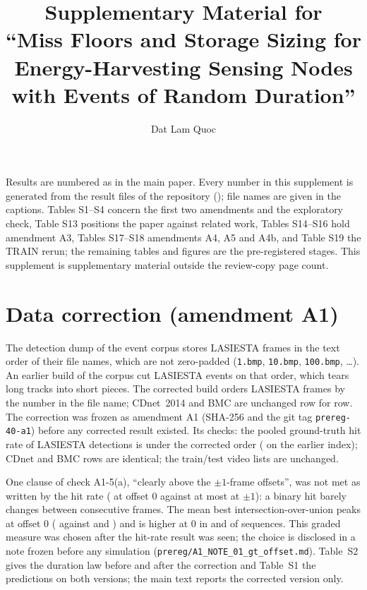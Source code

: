 \documentclass[10pt]{article}
\title{Supplementary Material for\\``Miss Floors and Storage Sizing for Energy-Harvesting Sensing Nodes with Events of Random Duration''}
\author{Dat Lam Quoc}
\date{}
\begin{document}
\maketitle
Results are numbered as in the main paper. Every number in this supplement is generated from the result files of the repository (\repoURL); file names are given in the captions. Tables S1--S4 concern the first two amendments and the exploratory check, Table S13 positions the paper against related work, Tables S14--S16 hold amendment A3, Tables S17--S18 amendments A4, A5 and A4b, and Table S19 the TRAIN rerun; the remaining tables and figures are the pre-registered stages. This supplement is supplementary material outside the review-copy page count.



\section{Data correction (amendment A1)}
The detection dump of the event corpus stores LASIESTA frames in the text order of their file names, which are not zero-padded (\texttt{1.bmp}, \texttt{10.bmp}, \texttt{100.bmp}, \ldots). An earlier build of the corpus cut LASIESTA events on that order, which tears long tracks into short pieces. The corrected build orders LASIESTA frames by the number in the file name; CDnet~2014 and BMC are unchanged row for row. The correction was frozen as amendment A1 (SHA-256 and the git tag \texttt{prereg-40-a1}) before any corrected result existed. Its checks: the pooled ground-truth hit rate of LASIESTA detections is \AoneHit{} under the corrected order (\AoneHitIdx{} on the earlier index); CDnet and BMC rows are identical; the train/test video lists are unchanged.

One clause of check A1-5(a), ``clearly above the $\pm1$-frame offsets'', was not met as written by the hit rate (\AoneHit{} at offset 0 against at most \AoneHitPm{} at $\pm1$): a binary hit barely changes between consecutive frames. The mean best intersection-over-union peaks at offset 0 (\AoneIoUz{} against \AoneIoUm{} and \AoneIoUp) and is higher at 0 in \AoneSeqM{} and \AoneSeqP{} of \AoneNseq{} sequences. This graded measure was chosen after the hit-rate result was seen; the choice is disclosed in a note frozen before any simulation (\texttt{prereg/A1\_NOTE\_01\_gt\_offset.md}). Table~S2 gives the duration law before and after the correction and Table~S1 the predictions on both versions; the main text reports the corrected version only.
\end{document}
